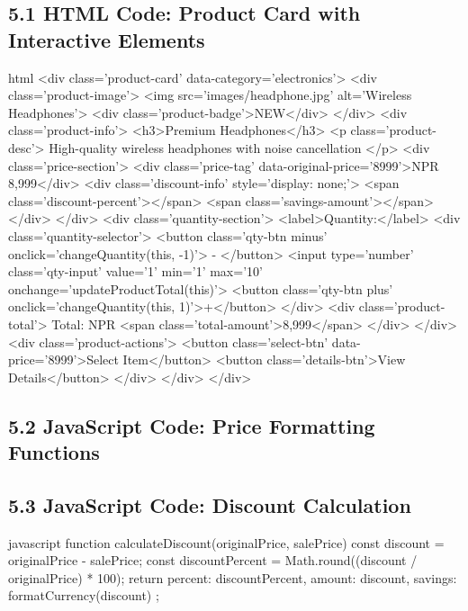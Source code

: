 \documentclass[a4paper,12pt]{article}
\begin{document}
\subsection*{5.1 HTML Code: Product Card with Interactive Elements}
\begin{code}[fontsize=\small]{html}
  <div class='product-card' data-category='electronics'>
  <div class='product-image'>
  <img src='images/headphone.jpg' alt='Wireless Headphones'>
  <div class='product-badge'>NEW</div>
  </div>
  <div class='product-info'>
  <h3>Premium Headphones</h3>
  <p class='product-desc'>
  High-quality wireless headphones with noise cancellation
  </p>
  <div class='price-section'>
  <div class='price-tag' data-original-price='8999'>NPR 8,999</div>
  <div class='discount-info' style='display: none;'>
  <span class='discount-percent'></span>
  <span class='savings-amount'></span>
  </div>
  </div>
  <div class='quantity-section'>
  <label>Quantity:</label>
  <div class='quantity-selector'>
  <button class='qty-btn minus' onclick='changeQuantity(this, -1)'> - </button>
  <input type='number' class='qty-input' value='1' min='1' max='10' onchange='updateProductTotal(this)'>
  <button class='qty-btn plus' onclick='changeQuantity(this, 1)'>+</button>
  </div>
  <div class='product-total'>
  Total: NPR <span class='total-amount'>8,999</span>
  </div>
  </div>
  <div class='product-actions'>
  <button class='select-btn' data-price='8999'>Select Item</button>
  <button class='details-btn'>View Details</button>
  </div>
  </div>
  </div>
\end{code}

\subsection*{5.2 JavaScript Code: Price Formatting Functions}

\subsection*{5.3 JavaScript Code: Discount Calculation}
\begin{code}[fontsize=\small]{javascript}
  function calculateDiscount(originalPrice, salePrice) {
      const discount = originalPrice - salePrice;
      const discountPercent = Math.round((discount / originalPrice) * 100);
      return {
          percent: discountPercent,
          amount: discount,
          savings: formatCurrency(discount)
        };
    }
\end{code}
\end{document}
